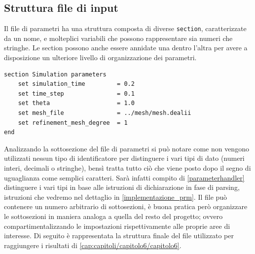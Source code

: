         \subsection{Struttura file di input}
        Il file di parametri ha una struttura composta di diverse \texttt{section}, caratterizzate da un nome, e molteplici variabili che possono rappresentare sia numeri che stringhe.
        Le section possono anche essere annidate una dentro l'altra per avere a disposizione un ulteriore livello di organizzazione dei parametri.
        \begin{verbatim}
section Simulation parameters
    set simulation_time         = 0.2
    set time_step               = 0.1
    set theta                   = 1.0
    set mesh_file               = ../mesh/mesh.dealii
    set refinement_mesh_degree  = 1
end
        \end{verbatim}
        Analizzando la sottosezione del file di parametri si può notare come non vengono utilizzati nessun tipo di identificatore per distinguere i vari tipi di dato (numeri interi, decimali o stringhe), bensì
        tratta tutto ciò che viene posto dopo il segno di uguaglianza come semplici caratteri. Sarà infatti compito di \ref*{parameterhandler} distinguere i vari tipi in base alle istruzioni di dichiarazione
        in fase di parsing, istruzioni che vedremo nel dettaglio in \ref{implementazione_prm}.
        Il file può contenere un numero arbitrario di sottosezioni, è buona pratica però organizzare le sottosezioni in maniera analoga a quella del resto del progetto; ovvero compartimentalizzando
        le impostazioni rispettivamente alle proprie aree di interesse. Di seguito è rappresentata la struttura finale del file utilizzato per raggiungere i risultati di \ref{cap:capitoli/capitolo6/capitolo6}.

